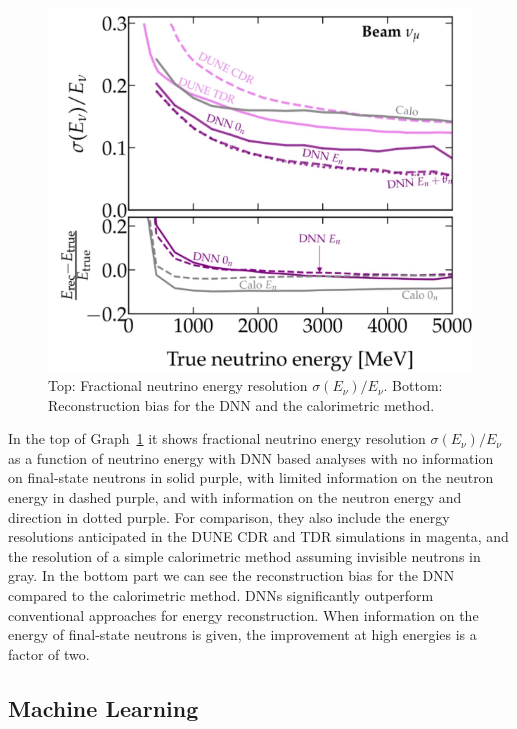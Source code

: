 \begin{figure}[H]
	\centering
	\includegraphics[width=\textwidth]{assets/DNNmachinelearning.png}
	\caption{Top: Fractional neutrino energy resolution $\sigma (E_{\nu})/E_{\nu}$. Bottom: Reconstruction bias for the DNN and the calorimetric method. 
	}
	\label{graph:DNN}
\end{figure}

In the top of Graph~\ref{graph:DNN} it shows fractional neutrino energy resolution $\sigma (E_{\nu})/E_{\nu}$ as a function of neutrino energy with DNN based analyses with no information on final-state neutrons in solid purple, with limited information on the neutron energy in dashed purple, and with information on the neutron energy and direction in dotted purple. For comparison, they also include the energy resolutions anticipated in the DUNE CDR and TDR simulations in magenta, and the resolution of a simple calorimetric method assuming invisible neutrons in gray. In the bottom part we can see the reconstruction bias for the DNN compared to the calorimetric method. DNNs significantly outperform conventional approaches for energy reconstruction. When information on the energy of final-state neutrons is given, the improvement at high energies is  a factor of two.

\subsection{Machine Learning}

